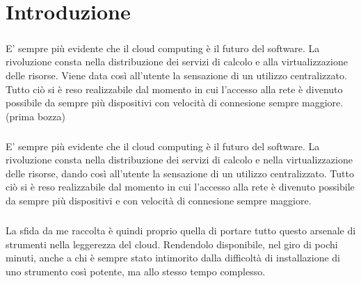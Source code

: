 \chapter{Introduzione}

\paragraph{}
E' sempre più evidente che il cloud computing è il futuro del software. La rivoluzione consta nella distribuzione dei servizi di calcolo e alla virtualizzazione delle risorse. Viene data così all'utente la sensazione di un utilizzo centralizzato. Tutto ciò si è reso realizzabile dal momento in cui l'accesso alla rete è divenuto possibile da sempre più dispositivi con velocità di connesione sempre maggiore.
(prima bozza)

\paragraph{}
E' sempre più evidente che il cloud computing è il futuro del software. La rivoluzione consta nella distribuzione dei servizi di calcolo e nella virtualizzazione delle risorse, dando così all'utente la sensazione di un utilizzo centralizzato. Tutto ciò si è reso realizzabile dal momento in cui l'accesso alla rete è divenuto possibile da sempre più dispositivi e con velocità di connesione sempre maggiore.
\paragraph{}
\paragraph{}
La sfida da me raccolta è quindi proprio quella di portare tutto questo arsenale di strumenti nella leggerezza del cloud. Rendendolo disponibile, nel giro di pochi minuti, anche a chi è sempre stato intimorito dalla difficoltà di installazione di uno strumento così potente, ma allo stesso tempo complesso.